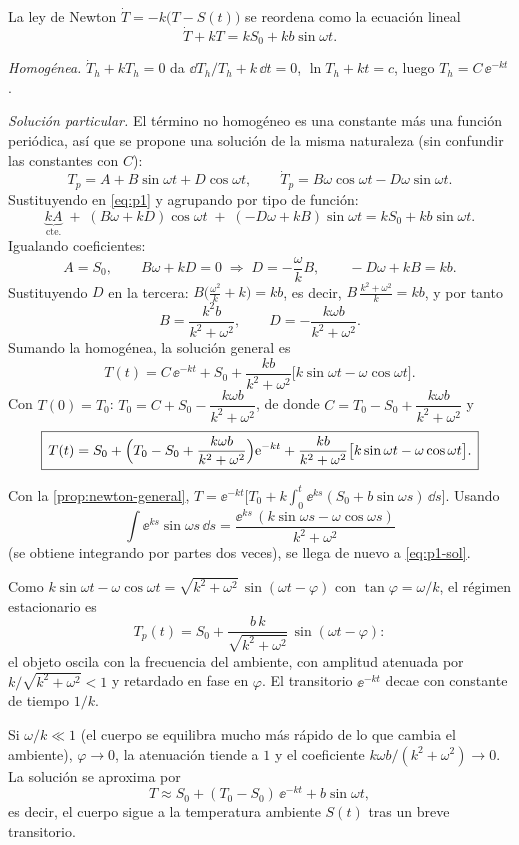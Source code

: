 \begin{solucion}
La ley de Newton $\dot T=-k\bigl(T-S(t)\bigr)$ se reordena como la ecuación lineal
\begin{equation}
  \dot T+kT=kS_0+kb\sin\omega t .
  \label{eq:p1}
\end{equation}

\emph{Homogénea.} $\dot T_h+kT_h=0$ da $\dd T_h/T_h+k\,\dd t=0$, $\ln T_h+kt=c$, luego $T_h=C\,\ee^{-kt}$.

\emph{Solución particular.} El término no homogéneo es una constante más una función periódica, así que se propone una solución de la misma naturaleza (sin confundir las constantes con $C$):
\[
  T_p=A+B\sin\omega t+D\cos\omega t,\qquad \dot T_p=B\omega\cos\omega t-D\omega\sin\omega t .
\]
Sustituyendo en \eqref{eq:p1} y agrupando por tipo de función:
\[
  \underbrace{kA}_{\text{cte.}}\;+\;(B\omega+kD)\cos\omega t\;+\;(-D\omega+kB)\sin\omega t
  =kS_0+kb\sin\omega t .
\]
Igualando coeficientes:
\[
  A=S_0,\qquad B\omega+kD=0\;\Rightarrow\;D=-\frac\omega kB,\qquad -D\omega+kB=kb .
\]
Sustituyendo $D$ en la tercera: $B\bigl(\tfrac{\omega^2}{k}+k\bigr)=kb$, es decir, $B\,\tfrac{k^2+\omega^2}{k}=kb$, y por tanto
\[
  B=\frac{k^2b}{k^2+\omega^2},\qquad D=-\frac{k\omega b}{k^2+\omega^2}.
\]
Sumando la homogénea, la solución general es
\begin{equation}
  T(t)=C\,\ee^{-kt}+S_0+\frac{kb}{k^2+\omega^2}\bigl[k\sin\omega t-\omega\cos\omega t\bigr].
  \label{eq:p1-general}
\end{equation}
Con $T(0)=T_0$: $T_0=C+S_0-\dfrac{k\omega b}{k^2+\omega^2}$, de donde $C=T_0-S_0+\dfrac{k\omega b}{k^2+\omega^2}$ y
\begin{equation}
  \boxed{\,T(t)=S_0+\Bigl(T_0-S_0+\frac{k\omega b}{k^2+\omega^2}\Bigr)\mathrm{e}^{-kt}+\frac{kb}{k^2+\omega^2}\bigl[k\sin\omega t-\omega\cos\omega t\bigr].\,}
  \label{eq:p1-sol}
\end{equation}

Con la \cref{prop:newton-general}, $T=\ee^{-kt}\bigl[T_0+k\int_0^t\ee^{ks}(S_0+b\sin\omega s)\,\dd s\bigr]$. Usando
\[
  \int \ee^{ks}\sin\omega s\,\dd s=\frac{\ee^{ks}\,(k\sin\omega s-\omega\cos\omega s)}{k^2+\omega^2}
\]
(se obtiene integrando por partes dos veces), se llega de nuevo a \eqref{eq:p1-sol}.

Como $k\sin\omega t-\omega\cos\omega t=\sqrt{k^2+\omega^2}\,\sin(\omega t-\varphi)$ con $\tan\varphi=\omega/k$, el régimen estacionario es
\[
  T_p(t)=S_0+\frac{b\,k}{\sqrt{k^2+\omega^2}}\,\sin(\omega t-\varphi):
\]
el objeto oscila con la frecuencia del ambiente, con amplitud atenuada por $k/\sqrt{k^2+\omega^2}<1$ y retardado en fase en $\varphi$. El transitorio $\ee^{-kt}$ decae con constante de tiempo $1/k$.

Si $\omega/k\ll1$ (el cuerpo se equilibra mucho más rápido de lo que cambia el ambiente), $\varphi\to0$, la atenuación tiende a $1$ y el coeficiente $k\omega b/(k^2+\omega^2)\to0$. La solución se aproxima por
\[
  T\approx S_0+(T_0-S_0)\,\ee^{-kt}+b\sin\omega t ,
\]
es decir, el cuerpo sigue a la temperatura ambiente $S(t)$ tras un breve transitorio.
\end{solucion}

